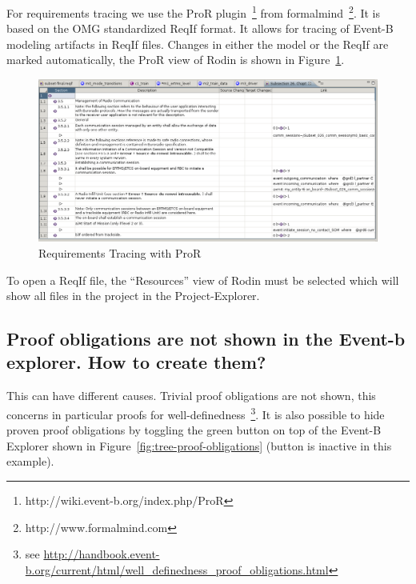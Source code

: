 \documentclass{template/openetcs_article}
\begin{document}
For requirements tracing we use the ProR
plugin~\footnote{http://wiki.event-b.org/index.php/ProR} from
formalmind~\footnote{http://www.formalmind.com}. It is based on the OMG
standardized ReqIf format. It allows for tracing of Event-B modeling artifacts
in ReqIf files. Changes in either the model or the ReqIf are marked
automatically, the ProR view of Rodin is shown in Figure~\ref{fig:req-tracing}.


\begin{figure}[H]
  \centering
  \includegraphics[width=\textwidth]{ReqIfinRodin}
  \caption{Requirements Tracing with ProR}
  \label{fig:req-tracing}
\end{figure}

To open a ReqIf file, the ``Resources'' view of Rodin must be selected which
will show all files in the project in the Project-Explorer.

\subsection{Proof obligations are not shown in the Event-b explorer. How to
  create them?}
\label{sec:proof-oblig-are}


This can have different causes. Trivial proof obligations are not shown, this
concerns in particular proofs for well-definedness~\footnote{see
  \url{http://handbook.event-b.org/current/html/well_definedness_proof_obligations.html}}. It
is also possible to hide proven proof obligations by toggling the green button
on top of the Event-B Explorer shown in
Figure~\ref{fig:tree-proof-obligations} (button is inactive in this example).
\end{document}

